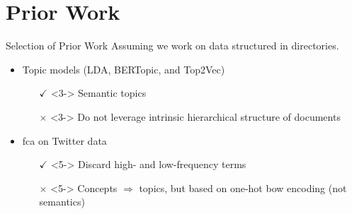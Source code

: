 \section{Prior Work}

\begin{frame}{Selection of Prior Work}
    Assuming we work on data structured in directories.
    \begin{itemize}
        \item<2-> Topic models (LDA, BERTopic, and Top2Vec)
        \begin{itemize}
            \item[$\checkmark$]<3-> Semantic topics
            \item[$\times$]<3-> Do not leverage intrinsic hierarchical structure of documents
        \end{itemize}

        \item<4-> \acs{fca} on Twitter data~\cite{twitter_fca_2016}
        \begin{itemize}
            \item[$\checkmark$]<5-> Discard high- and low-frequency terms
            \item[$\times$]<5-> Concepts $\Rightarrow$ topics, but based on one-hot \ac{bow} encoding (not semantics)
        \end{itemize}
      
    \end{itemize}
\end{frame}



